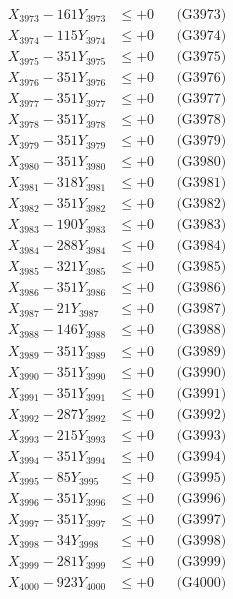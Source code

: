 \documentclass[a4paper,10pt]{article}
\begin{document}
{\begin{align}
X_{3973} - 161Y_{3973} &\leq +0 && \text{(G3973)} \\
X_{3974} - 115Y_{3974} &\leq +0 && \text{(G3974)} \\
X_{3975} - 351Y_{3975} &\leq +0 && \text{(G3975)} \\
X_{3976} - 351Y_{3976} &\leq +0 && \text{(G3976)} \\
X_{3977} - 351Y_{3977} &\leq +0 && \text{(G3977)} \\
X_{3978} - 351Y_{3978} &\leq +0 && \text{(G3978)} \\
X_{3979} - 351Y_{3979} &\leq +0 && \text{(G3979)} \\
X_{3980} - 351Y_{3980} &\leq +0 && \text{(G3980)} \\
\allowbreak
X_{3981} - 318Y_{3981} &\leq +0 && \text{(G3981)} \\
X_{3982} - 351Y_{3982} &\leq +0 && \text{(G3982)} \\
X_{3983} - 190Y_{3983} &\leq +0 && \text{(G3983)} \\
X_{3984} - 288Y_{3984} &\leq +0 && \text{(G3984)} \\
X_{3985} - 321Y_{3985} &\leq +0 && \text{(G3985)} \\
X_{3986} - 351Y_{3986} &\leq +0 && \text{(G3986)} \\
X_{3987} - 21Y_{3987} &\leq +0 && \text{(G3987)} \\
X_{3988} - 146Y_{3988} &\leq +0 && \text{(G3988)} \\
X_{3989} - 351Y_{3989} &\leq +0 && \text{(G3989)} \\
X_{3990} - 351Y_{3990} &\leq +0 && \text{(G3990)} \\
\allowbreak
X_{3991} - 351Y_{3991} &\leq +0 && \text{(G3991)} \\
X_{3992} - 287Y_{3992} &\leq +0 && \text{(G3992)} \\
X_{3993} - 215Y_{3993} &\leq +0 && \text{(G3993)} \\
X_{3994} - 351Y_{3994} &\leq +0 && \text{(G3994)} \\
X_{3995} - 85Y_{3995} &\leq +0 && \text{(G3995)} \\
X_{3996} - 351Y_{3996} &\leq +0 && \text{(G3996)} \\
X_{3997} - 351Y_{3997} &\leq +0 && \text{(G3997)} \\
X_{3998} - 34Y_{3998} &\leq +0 && \text{(G3998)} \\
X_{3999} - 281Y_{3999} &\leq +0 && \text{(G3999)} \\
X_{4000} - 923Y_{4000} &\leq +0 && \text{(G4000)} \\

\end{align}}
\end{document}
